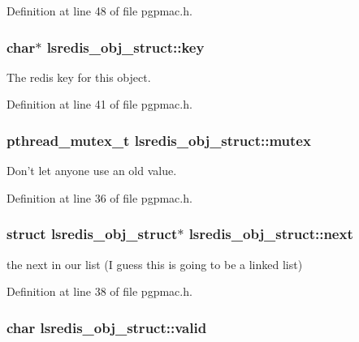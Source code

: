 Definition at line 48 of file pgpmac.\-h.

\hypertarget{structlsredis__obj__struct_aa8c5a453b9424e5666320b8675a42f5c}{
\subsubsection[{key}]{\setlength{\rightskip}{0pt plus 5cm}char$\ast$ lsredis\-\_\-obj\-\_\-struct\-::key}}\label{structlsredis__obj__struct_aa8c5a453b9424e5666320b8675a42f5c}


The redis key for this object. 



Definition at line 41 of file pgpmac.\-h.

\hypertarget{structlsredis__obj__struct_a0da18e7d0f7d52459bbc6fbc696d5252}{
\subsubsection[{mutex}]{\setlength{\rightskip}{0pt plus 5cm}pthread\-\_\-mutex\-\_\-t lsredis\-\_\-obj\-\_\-struct\-::mutex}}\label{structlsredis__obj__struct_a0da18e7d0f7d52459bbc6fbc696d5252}


Don't let anyone use an old value. 



Definition at line 36 of file pgpmac.\-h.

\hypertarget{structlsredis__obj__struct_afb7259e8c3c1c83ccc234b2b2894f2b0}{
\subsubsection[{next}]{\setlength{\rightskip}{0pt plus 5cm}struct {\bf lsredis\-\_\-obj\-\_\-struct}$\ast$ lsredis\-\_\-obj\-\_\-struct\-::next}}\label{structlsredis__obj__struct_afb7259e8c3c1c83ccc234b2b2894f2b0}


the next in our list (I guess this is going to be a linked list) 



Definition at line 38 of file pgpmac.\-h.

\hypertarget{structlsredis__obj__struct_a338ffa4123bd06b39c8b58f5e695575e}{
\subsubsection[{valid}]{\setlength{\rightskip}{0pt plus 5cm}char lsredis\-\_\-obj\-\_\-struct\-::valid}}\label{structlsredis__obj__struct_a338ffa4123bd06b39c8b58f5e695575e}



